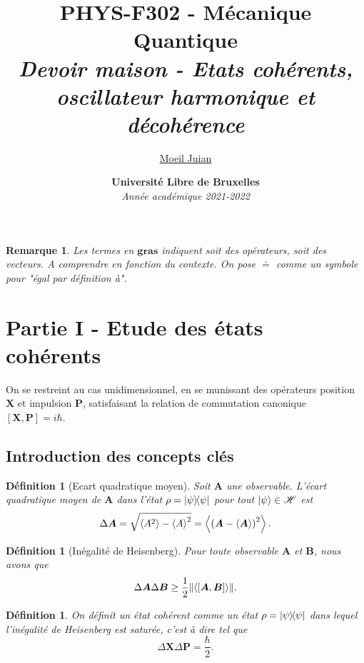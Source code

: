 \documentclass[11pt,oneside,a4paper]{article}
\title{%
  \textbf{PHYS-F302 - Mécanique Quantique} \\
  \textit{Devoir maison - Etats cohérents, oscillateur harmonique et décohérence}
}
\author{%
  \href{mailto:juian.moeil@ulb.be}{Moeil Juian}
}
\date{%
  \textbf{Université Libre de Bruxelles} \\
  \emph{Année académique 2021-2022}
}
\newcommand{\h}{\ensuremath{\hbar}}
\newtheorem{definition}[theorem]{Définition}
\newtheorem{remark}[theorem]{Remarque}
\begin{document}
\maketitle
\tableofcontents
\newpage

\begin{remark}
  Les termes en $\bm{gras}$ indiquent soit des opérateurs, soit des vecteurs. A comprendre en fonction du contexte. On pose $\doteq$ comme un symbole pour "égal par définition à".
\end{remark}
\section{Partie I - Etude des états cohérents}
On se restreint au cas unidimensionnel, en se munissant des opérateurs position $\bm{X}$ et impulsion $\bm{P}$, satisfaisant la relation de commutation canonique $[\bm{X},\bm{P}] = i\h$.

\subsection*{Introduction des concepts clés}
\begin{definition}[Ecart quadratique moyen]
  Soit $\bm{A}$ une observable. L'écart quadratique moyen de $\bm{A}$ dans l'état $\rho = \ketbra{\psi}$ pour tout $\ket{\psi}\in\mathcal{H}$ est 
  \begin{equation}
    \Delta\bm{A} = \sqrt{\expval{A^2}-\expval{A}^2} = \expval{\left(\bm{A}-\expval{\bm{A}}\right)^2}.
  \end{equation}
\end{definition}

\begin{definition}[Inégalité de Heisenberg]
  Pour toute observable $\bm{A}$ et $\bm{B}$, nous avons que
  \begin{equation}
    \label{Heisenberg inequality}
    \Delta\bm{A}\Delta\bm{B}\geq\frac{1}{2}\norm{\expval{[\bm{A},\bm{B}]}}.
  \end{equation}
\end{definition}

\begin{definition}
  \label{def etat coherent saturation}
    On définit un état cohérent comme un état $\rho = \ketbra{\psi}$ dans lequel l'inégalité de Heisenberg est saturée, c'est à dire tel que
    \begin{equation}
      \Delta\bm{X}\Delta\bm{P} = \frac{\h}{2}.
    \end{equation} 
\end{definition}
\end{document}
